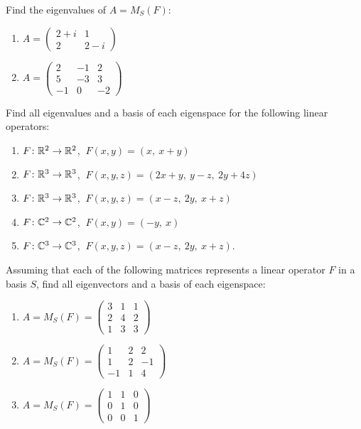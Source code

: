 \begin{exercise}
Find the eigenvalues of $A = M_S(F)$:
\begin{enumerate}[label=(\alph*)]
\item $A = \left( \begin{array}{cc} 2+i & 1\\ 2 & 2-i \end{array} \right)$
\item $A = \left( \begin{array}{ccc} 2 & -1 & 2\\ 5 & -3 & 3\\ -1 & 0 & -2 \end{array} \right)$
\end{enumerate}
\end{exercise}

\begin{exercise}
Find all eigenvalues and a basis of each eigenspace for the following linear operators:
\begin{enumerate}[label=(\alph*)]
\item $F\colon\mathbb{R}^2\to\mathbb{R}^2$, $\ F(x,y) = (x,\ x+y)$
\item $F\colon\mathbb{R}^3\to\mathbb{R}^3$, $\ F(x,y,z) = (2x+y,\ y-z,\ 2y+4z)$
\item $F\colon\mathbb{R}^3\to\mathbb{R}^3$, $\ F(x,y,z) = (x-z,\ 2y,\ x+z)$
\item $F\colon\mathbb{C}^2\to\mathbb{C}^2$, $\ F(x,y) = (-y,\ x)$
\item $F\colon\mathbb{C}^3\to\mathbb{C}^3$, $\ F(x,y,z) = (x-z,\ 2y,\ x+z)$.
\end{enumerate}
\end{exercise}

\begin{exercise}\label{ex:eig-matrices}
Assuming that each of the following matrices represents a linear operator $F$ in a basis $S$, find all
eigenvectors and a basis of each eigenspace:
\begin{enumerate}[label=(\alph*)]
\item $A = M_S(F) = \left( \begin{array}{ccc} 3 & 1 & 1\\ 2 & 4 & 2\\ 1 & 3 & 3 \end{array} \right)$
\item $A = M_S(F) = \left( \begin{array}{ccc} 1 & 2 & 2\\ 1 & 2 & -1\\ -1 & 1 & 4 \end{array} \right)$
\item $A = M_S(F) = \left( \begin{array}{ccc} 1 & 1 & 0\\ 0 & 1 & 0\\ 0 & 0 & 1 \end{array} \right)$
\end{enumerate}
\end{exercise}

